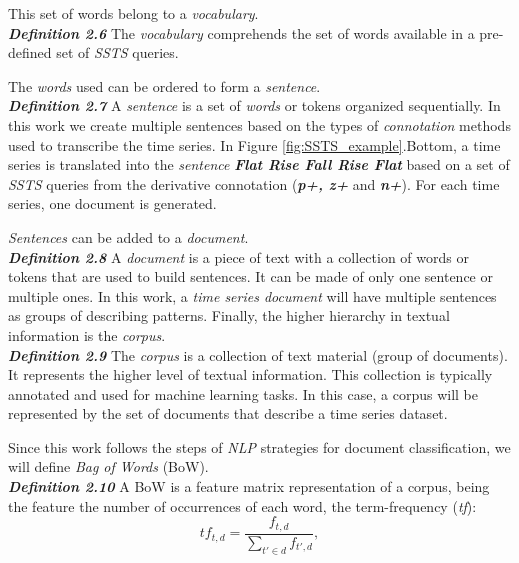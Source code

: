 This set of words belong to a \textit{vocabulary}.\\

\textit{\textbf{Definition 2.6}} The \textit{vocabulary} comprehends the set of words available in a pre-defined set of \textit{SSTS} queries.

The \textit{words} used can be ordered to form a \textit{sentence}.\\

\textit{\textbf{Definition 2.7}} \space \space A \textit{sentence} is a set of \textit{words} or tokens organized sequentially. In this work we create multiple sentences based on the types of \textit{connotation} methods used to transcribe the time series. In Figure \ref{fig:SSTS_example}.Bottom, a time series is translated into the \textit{sentence} \textbf{\textit{Flat Rise Fall Rise Flat}} based on a set of \textit{SSTS} queries from the derivative connotation (\textit{\textbf{p+, z+}} and \textbf{\textit{n+}}). 
For each time series, one document is generated. 

\textit{Sentences} can be added to a \textit{document}. \\

\textit{\textbf{Definition 2.8}} \space \space A \textit{document} is a piece of text with a collection of words or tokens that are used to build sentences. It can be made of only one sentence or multiple ones. In this work, a \textit{time series document} will have multiple sentences as groups of describing patterns. 
Finally, the higher hierarchy in textual information is the \textit{corpus}.\\

\textit{\textbf{Definition 2.9}} \space \space The \textit{corpus} is a collection of text material (group of documents). It represents the higher level of textual information. This collection is typically annotated and used for machine learning tasks. In this case, a corpus will be represented by the set of documents that describe a time series dataset.

Since this work follows the steps of \textit{NLP} strategies for document classification, we will define \textit{Bag of Words} (BoW).\\

\textit{\textbf{Definition 2.10}} \space \space A BoW is a feature matrix representation of a corpus, being the feature the number of occurrences of each word, the term-frequency (\textit{tf}):
\begin{equation}
    tf_{t,d} = \frac{f_{t,d}}{\sum\limits_{t'\in d} f_{t',d}}, 
\end{equation}

